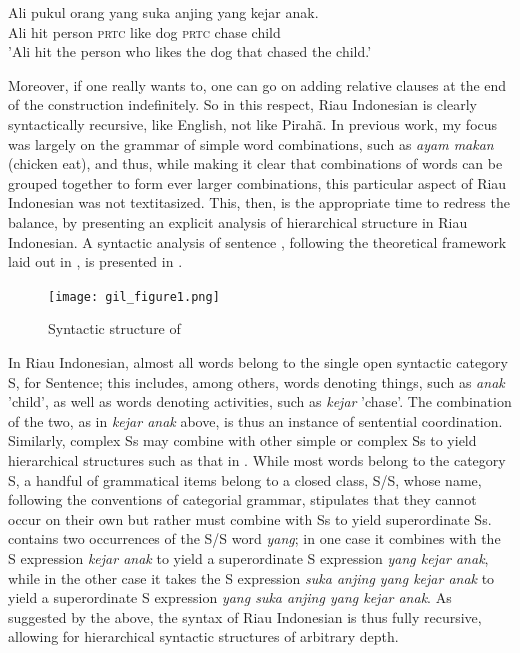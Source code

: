 \documentclass[output=paper,colorlinks,citecolor=brown
]{langscibook}
\begin{document}
\ea\label{ex:gil:1}
\gll Ali	pukul	orang	yang	suka	anjing	yang	kejar	anak.\\
 Ali	hit	person	\textsc{prtc}	like	dog	\textsc{prtc}	chase	child\\
\glt 'Ali hit the person who likes the dog that chased the child.'
\z

Moreover, if one really wants to, one can go on adding relative clauses at the end of the construction indefinitely. So in this respect, Riau Indonesian is clearly syntactically recursive, like English, not like Pirahã.
In previous work, my focus was largely on the grammar of simple word combinations, such as \textit{ayam makan} (chicken eat), and thus, while making it clear that combinations of words can be grouped together to form ever larger combinations, this particular aspect of Riau Indonesian was not textitasized. This, then, is the appropriate time to redress the balance, by presenting an explicit analysis of hierarchical structure in Riau Indonesian. A syntactic analysis of sentence , following the theoretical framework laid out in \citet{gil2000syntactic}, is presented in .

\begin{figure}
\centering
\texttt{[image: gil\_figure1.png]}
\caption{\label{fig:gil:fig1}Syntactic structure of }
\end{figure}

In Riau Indonesian, almost all words belong to the single open syntactic category S, for Sentence; this includes, among others, words denoting things, such as \textit{anak} 'child', as well as words denoting activities, such as \textit{kejar} 'chase'. The combination of the two, as in \textit{kejar anak} above, is thus an instance of sentential coordination. Similarly, complex Ss may combine with other simple or complex Ss to yield hierarchical structures such as that in . While most words belong to the category S, a handful of grammatical items belong to a closed class, S/S, whose name, following the conventions of categorial grammar, stipulates that they cannot occur on their own but rather must combine with Ss to yield superordinate Ss.  contains two occurrences of the S/S word \textit{yang}; in one case it combines with the S expression \textit{kejar anak} to yield a superordinate S expression \textit{yang kejar anak}, while in the other case it takes the S expression \textit{suka anjing yang kejar anak} to yield a superordinate S expression \textit{yang suka anjing yang kejar anak}. As suggested by the above, the syntax of Riau Indonesian is thus fully recursive, allowing for hierarchical syntactic structures of arbitrary depth.
\end{document}
